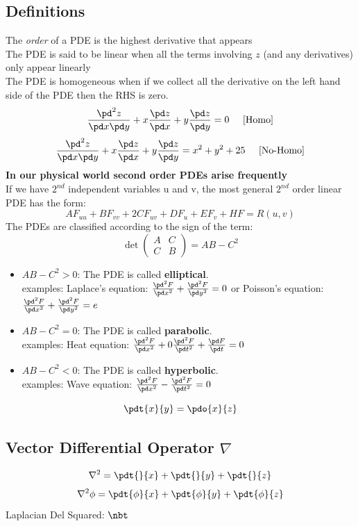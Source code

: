 \documentclass[11pt]{article}
\theoremstyle{definition}
\begin{document}
\subsection{Definitions}
The \textit{order} of a PDE is the highest derivative that appears\\
The PDE is said to be linear when all the terms involving $z$ (and any derivatives) only appear linearly\\
The PDE is homogeneous when if we collect all the derivative on the left hand side of the PDE then the RHS is zero.\\
$$\frac{\pd^2z}{\pd x \pd y} + x\frac{\pd z}{\pd x} + y \frac{\pd z}{\pd y} = 0 \;\;\;\;\; \text{[Homo]}$$
$$\frac{\pd^2z}{\pd x \pd y} + x\frac{\pd z}{\pd x} + y \frac{\pd z}{\pd y} = x^2 + y^2 + 25 \;\;\;\;\; \text{[No-Homo]}$$
\textbf{In our physical world second order PDEs arise frequently}\\
If we have $2^{nd}$ independent variables u and v, the most general $2^{nd}$ order linear PDE  has the form:
$$AF_{uu} + BF_{vv} + 2CF_{uv} + DF_u + EF_v + HF = R(u,v)$$
The PDEs are classified according to the sign of the term:
$$\det\begin{pmatrix} A & C \\ C & B \end{pmatrix} = AB - C^2$$
\begin{itemize}
    \item $AB - C^2 > 0$: The PDE is called \textbf{elliptical}. \\
    examples: Laplace's equation: $\frac{\pd^2 F}{\pd x^2} + \frac{\pd^2 F}{\pd y^2} = 0$ or Poisson's equation: $\frac{\pd^2 F}{\pd x^2} + \frac{\pd^2 F}{\pd y^2} = e$
    \item $AB - C^2 = 0$: The PDE is called \textbf{parabolic}. \\
    examples: Heat equation: $\frac{\pd^2 F}{\pd x^2} + 0\frac{\pd^2 F}{\pd t^2} + \frac{\pd F}{\pd t}= 0$
    \item $AB - C^2 < 0$: The PDE is called \textbf{hyperbolic}. \\
    examples: Wave equation: $\frac{\pd^2 F}{\pd x^2} - \frac{\pd^2 F}{\pd t^2} = 0$
\end{itemize}
$$\pdt{x}{y} = \pdo{x}{z}$$
\subsection{Vector Differential Operator $\nabla$}
$$\nabla^2 = \pdt{}{x} + \pdt{}{y} + \pdt{}{z}$$
$$\nabla^2 \phi = \pdt{\phi}{x} + \pdt{\phi}{y} + \pdt{\phi}{z}$$
Laplacian Del Squared: $\nbt$
\end{document}

